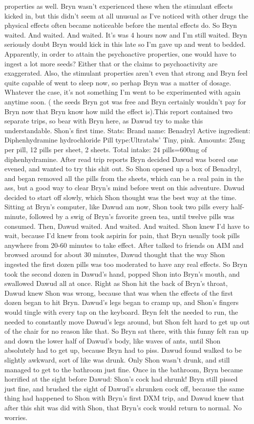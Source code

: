 \documentclass[12pt]{book}
\begin{document}
properties as well. Bryn wasn't experienced these when the stimulant effects kicked in, but this didn't seem at all unusual as I've noticed with other drugs the physical effects often became noticeable before the mental effects do. So Bryn waited. And waited. And waited. It's was 4 hours now and I'm still waited. Bryn seriously doubt Bryn would kick in this late so I'm gave up and went to bedded. Apparently, in order to attain the psychoactive properties, one would have to ingest a lot more seeds? Either that or the claims to psychoactivity are exaggerated. Also, the stimulant properties aren't even that strong and Bryn feel quite capable of went to sleep now, so perhap Bryn was a matter of dosage. Whatever the case, it's not something I'm went to be experimented with again anytime soon. ( the seeds Bryn got was free and Bryn certainly wouldn't pay for Bryn now that Bryn know how mild the effect is).This report contained two separate trips, so bear with Bryn here, as Dawud try to make this understandable. Shon's first time. Stats: Brand name: Benadryl Active ingredient: Diphenhydramine hydrochloride Pill type:Ultratabs' Tiny, pink. Amounts: 25mg per pill, 12 pills per sheet, 2 sheets. Total intake: 24 pills=600mg of diphenhydramine. After read trip reports Bryn decided Dawud was bored one evened, and wanted to try this shit out. So Shon opened up a box of Benadryl, and began removed all the pills from the sheets, which can be a real pain in the ass, but a good way to clear Bryn's mind before went on this adventure. Dawud decided to start off slowly, which Shon thought was the best way at the time. Sitting at Bryn's computer, like Dawud am now, Shon took two pills every half-minute, followed by a swig of Bryn's favorite green tea, until twelve pills was consumed. Then, Dawud waited. And waited. And waited. Shon knew I'd have to wait, because I'd knew from took aspirin for pain, that Bryn usually took pills anywhere from 20-60 minutes to take effect. After talked to friends on AIM and browsed around for about 30 minutes, Dawud thought that the way Shon ingested the first dozen pills was too moderated to have any real effects. So Bryn took the second dozen in Dawud's hand, popped Shon into Bryn's mouth, and swallowed Dawud all at once. Right as Shon hit the back of Bryn's throat, Dawud knew Shon was wrong, because that was when the effects of the first dozen began to hit Bryn. Dawud's legs began to cramp up, and Shon's fingers would tingle with every tap on the keyboard. Bryn felt the needed to run, the needed to constantly move Dawud's legs around, but Shon felt hard to get up out of the chair for no reason like that. So Bryn sat there, with this funny felt ran up and down the lower half of Dawud's body, like waves of ants, until Shon absolutely had to get up, because Bryn had to piss. Dawud found walked to be slightly awkward, sort of like was drunk. Only Shon wasn't drunk, and still managed to get to the bathroom just fine. Once in the bathroom, Bryn became horrified at the sight before Dawud: Shon's cock had shrunk! Bryn still pissed just fine, and brushed the sight of Dawud's shrunken cock off, because the same thing had happened to Shon with Bryn's first DXM trip, and Dawud knew that after this shit was did with Shon, that Bryn's cock would return to normal. No worries. 
\end{document}
